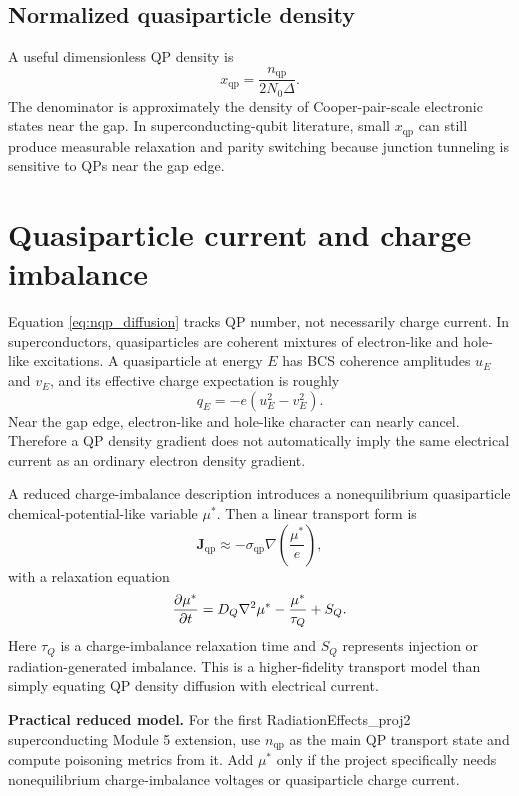\documentclass[11pt]{article}
\newcommand{\DeltaSC}{\Delta}
\newcommand{\nqp}{n_{\mathrm{qp}}}
\newcommand{\xqp}{x_{\mathrm{qp}}}
\newcommand{\Nzero}{N_0}
\newcommand{\Jqp}{\bm{J}_{\mathrm{qp}}}
\newcommand{\mustar}{\mu^*}
\begin{document}
\subsection{Normalized quasiparticle density}

A useful dimensionless QP density is
\begin{equation}
\xqp = \frac{\nqp}{2\Nzero\DeltaSC}.
\label{eq:xqp}
\end{equation}
The denominator is approximately the density of Cooper-pair-scale electronic states near the gap. In superconducting-qubit literature, small \(\xqp\) can still produce measurable relaxation and parity switching because junction tunneling is sensitive to QPs near the gap edge.

\section{Quasiparticle current and charge imbalance}

Equation \eqref{eq:nqp_diffusion} tracks QP number, not necessarily charge current. In superconductors, quasiparticles are coherent mixtures of electron-like and hole-like excitations. A quasiparticle at energy \(E\) has BCS coherence amplitudes \(u_E\) and \(v_E\), and its effective charge expectation is roughly
\begin{equation}
q_E = -e\left(u_E^2-v_E^2\right).
\end{equation}
Near the gap edge, electron-like and hole-like character can nearly cancel. Therefore a QP density gradient does not automatically imply the same electrical current as an ordinary electron density gradient.

A reduced charge-imbalance description introduces a nonequilibrium quasiparticle chemical-potential-like variable \(\mustar\). Then a linear transport form is
\begin{equation}
\Jqp \approx -\sigma_{\mathrm{qp}}\nabla\left(\frac{\mustar}{e}\right),
\label{eq:qp_current}
\end{equation}
with a relaxation equation
\begin{equation}
\pdv{\mustar}{t}=D_Q\nabla^2\mustar-\frac{\mustar}{\tau_Q}+S_Q.
\end{equation}
Here \(\tau_Q\) is a charge-imbalance relaxation time and \(S_Q\) represents injection or radiation-generated imbalance. This is a higher-fidelity transport model than simply equating QP density diffusion with electrical current.

\begin{notebox}
\textbf{Practical reduced model.} For the first RadiationEffects\_proj2 superconducting Module 5 extension, use \(\nqp\) as the main QP transport state and compute poisoning metrics from it. Add \(\mustar\) only if the project specifically needs nonequilibrium charge-imbalance voltages or quasiparticle charge current.
\end{notebox}
\end{document}
